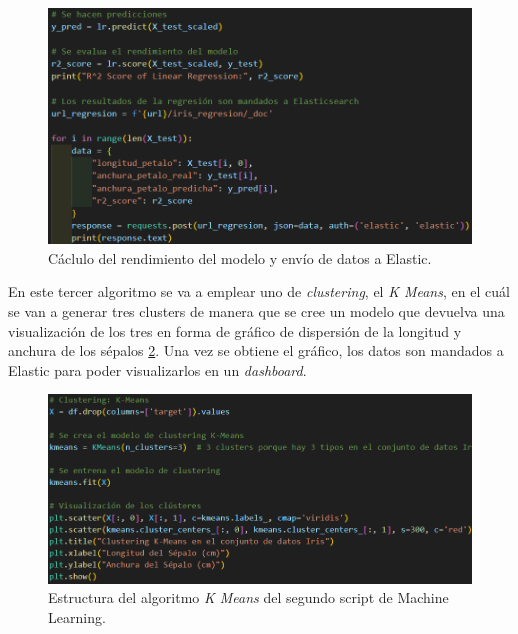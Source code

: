 \begin{figure}
    \centering
    \includegraphics[width=1\linewidth]{img/iris9.png}
    \caption{Cáclulo del rendimiento del modelo y envío de datos a Elastic.}
    \label{fig:regresion2}
\end{figure}


En este tercer algoritmo se va a emplear uno de \textit{clustering}, el \textit{K Means}, en el cuál se van a generar tres clusters de manera que se cree un modelo que devuelva una visualización de los tres en forma de gráfico de dispersión de la longitud y anchura de los sépalos \ref{fig:cluster1}. Una vez se obtiene el gráfico, los datos son mandados a Elastic para poder visualizarlos en un \textit{dashboard}.
\begin{figure}
    \centering
    \includegraphics[width=1\linewidth]{img/iris10.png}
    \caption{Estructura del algoritmo \textit{K Means} del segundo script de Machine Learning.}
    \label{fig:cluster1}
\end{figure}

\paragraph{}
\paragraph{}

